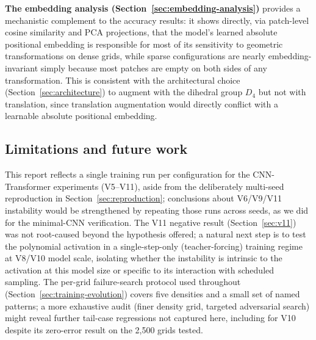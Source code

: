 \textbf{The embedding analysis (Section~\ref{sec:embedding-analysis})}
provides a mechanistic complement to the accuracy results: it shows
directly, via patch-level cosine similarity and PCA projections, that the
model's learned absolute positional embedding is responsible for most of
its sensitivity to geometric transformations on dense grids, while sparse
configurations are nearly embedding-invariant simply because most patches
are empty on both sides of any transformation. This is consistent with the
architectural choice (Section~\ref{sec:architecture}) to augment with the
dihedral group $D_4$ but not with translation, since translation
augmentation would directly conflict with a learnable absolute positional
embedding.

\subsection*{Limitations and future work}

This report reflects a single training run per configuration for the
CNN-Transformer experiments (V5--V11), aside from the deliberately
multi-seed reproduction in Section~\ref{sec:reproduction}; conclusions
about V6/V9/V11 instability would be strengthened by repeating those runs
across seeds, as we did for the minimal-CNN verification. The V11 negative
result (Section~\ref{sec:v11}) was not root-caused beyond the hypothesis
offered; a natural next step is to test the polynomial activation in a
single-step-only (teacher-forcing) training regime at V8/V10 model scale,
isolating whether the instability is intrinsic to the activation at this
model size or specific to its interaction with scheduled sampling. The
per-grid failure-search protocol used throughout
(Section~\ref{sec:training-evolution}) covers five densities and a small
set of named patterns; a more exhaustive audit (finer density grid,
targeted adversarial search) might reveal further tail-case regressions
not captured here, including for V10 despite its zero-error result on the
2,500 grids tested.
